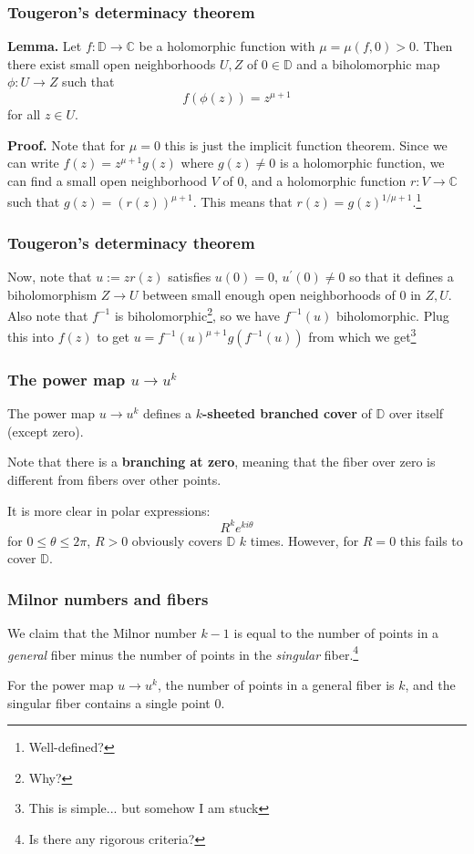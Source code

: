 \documentclass{beamer}
\begin{document}
\begin{frame}
\frametitle{Tougeron's determinacy theorem}

\textbf{Lemma.} Let $f: \mathbb{D} \to \mathbb{C}$ be a holomorphic function with $\mu = \mu(f,0) > 0$. Then there exist small open neighborhoods $U,Z$ of $0 \in \mathbb{D}$ and a biholomorphic map $\phi: U \to Z$ such that \[f(\phi(z)) = z^{\mu + 1}\] for all $z \in U$.

\phantom{?}

\textbf{Proof.} Note that for $\mu = 0$ this is just the implicit function theorem. Since we can write $f(z) = z^{\mu + 1}g(z)$ where $g(z) \neq 0$ is a holomorphic function, we can find a small open neighborhood $V$ of $0$, and a holomorphic function $r : V \to \mathbb{C}$ such that $g(z) = (r(z))^{\mu + 1}$. This means that $r(z) = g(z)^{1/\mu+1}$.\footnote{Well-defined?}

\end{frame}


\begin{frame}
\frametitle{Tougeron's determinacy theorem}

Now, note that $ u := zr(z)$ satisfies $u(0) = 0$, $u^\prime(0) \neq 0$ so that it defines a biholomorphism $Z \to U$ between small enough open neighborhoods of $0$ in $Z,U$. Also note that $f^{-1}$ is biholomorphic\footnote{Why?}, so we have $f^{-1}(u)$ biholomorphic. Plug this into $f(z)$ to get $u = f^{-1}(u)^{\mu+1}g(f^{-1}(u))$ from which we get\footnote{This is simple... but somehow I am stuck}

\end{frame}


\begin{frame}
\frametitle{The power map $u \to u^k$}

The power map $u \to u^k$ defines a $k$\textbf{-sheeted branched cover} of $\mathbb{D}$ over itself (except zero).

\phantom{?}

Note that there is a \textbf{branching at zero}, meaning that the fiber over zero is different from fibers over other points.

\phantom{?}

It is more clear in polar expressions: \[R^k e^{ki\theta}\] for $0 \leq \theta \leq 2\pi$, $R>0$ obviously covers $\mathbb{D}$ $k$ times. However, for $R=0$ this fails to cover $\mathbb{D}$.

\end{frame}

\begin{frame}
\frametitle{Milnor numbers and fibers}

We claim that the Milnor number $k-1$ is equal to the number of points in a \textit{general} fiber minus the number of points in the \textit{singular} fiber.\footnote{Is there any rigorous criteria?}

\phantom{?}

For the power map $u \to u^k$, the number of points in a general fiber is $k$, and the singular fiber contains a single point $0$.

\end{frame}
\end{document}
